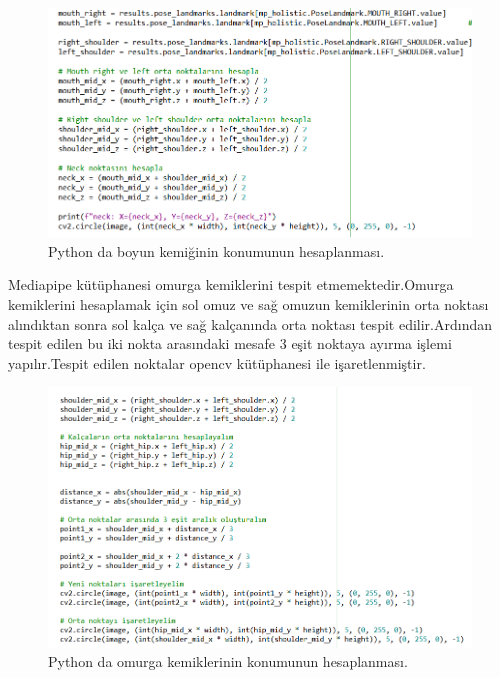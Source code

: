 \documentclass[12pt, a4paper]{article}
\begin{document}
\begin{figure}[h] 
	\centering
	\includegraphics[width=15 cm , height = 7 cm ]{code1.png}
	\caption{Python da boyun kemiğinin konumunun hesaplanması.}
\end{figure}
Mediapipe kütüphanesi omurga kemiklerini tespit etmemektedir.Omurga kemiklerini hesaplamak için sol omuz ve sağ omuzun kemiklerinin orta noktası alındıktan sonra sol kalça ve sağ kalçanında orta noktası tespit edilir.Ardından tespit edilen bu iki nokta arasındaki mesafe 3 eşit noktaya ayırma işlemi yapılır.Tespit edilen noktalar opencv kütüphanesi ile işaretlenmiştir.
\begin{figure}[h!]
	\caption{Python da omurga kemiklerinin konumunun hesaplanması.}
	\centering
	\includegraphics[width=18 cm , height = 8 cm]{code2.png}
\end{figure}
\end{document}
